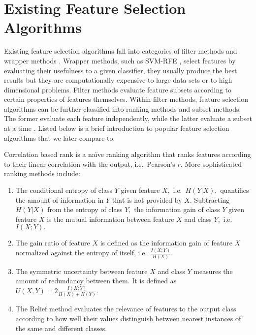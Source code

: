 \section{Existing Feature Selection Algorithms}

Existing feature selection algorithms fall into categories of filter
methods and wrapper methods \cite{guyon_jmlr03}. Wrapper methods, such as SVM-RFE \cite{guyon2002gene}, select features by evaluating their usefulness to a given classifier, they usually produce the best results but they are computationally expensive to large data sets or to high dimensional problems. Filter methods
evaluate feature subsets according to certain properties of features 
themselves. Within filter methods, feature selection algorithms can be
further classified into ranking methods and subset methods. The former
evaluate each feature independently, while the latter evaluate a
subset at a time \cite{brown2012conditional}. Listed below is a brief
introduction to popular feature selection algorithms that we later
compare to.

Correlation based rank is a na\"{i}ve ranking algorithm that ranks
features according to their linear correlation with the output,
i.e.\ Pearson's $r.$ More sophisticated ranking methods include:
\begin{enumerate}
\item The conditional entropy of class $Y$ given feature $X,$
  i.e.\ $H\left(Y|X\right),$ quantifies the amount of information in
  $Y$ that is not provided by $X.$ Subtracting $H\left(Y|X\right)$
  from the entropy of class $Y,$ the information gain of class $Y$
  given feature $X$ is the mutual information between feature $X$ and
  class $Y,$ i.e.\ $I\left(X;Y\right).$
\item The gain ratio of feature $X$ is defined as the information gain
  of feature $X$ normalized against the entropy of itself,
  i.e.\ $\frac{I\left(X;Y\right)}{H\left(X\right)}.$
\item The symmetric uncertainty between feature $X$ and class $Y$
  measures the amount of redundancy between them. It is defined as
  $U\left(X,Y\right)=2\frac{I\left(X;Y\right)}{H\left(X\right)+H\left(Y\right)}.$
\item The Relief method \cite{kira1992feature} evaluates the relevance
  of features to the output class according to how well their values
  distinguish between nearest instances of the same and different
  classes.
\end{enumerate}


